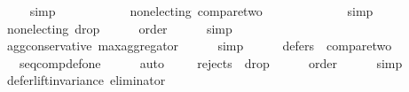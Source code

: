 \begin{isabellebody}
\ \ \ \ \isamarkupfalse%
\ simp\isanewline
\ \ \ \ \ \ \isanewline
\ \ \isamarkupfalse%
\ {}{}{}{\isacharcolon}{\kern0pt}\ {\isachardoublequoteopen}non{\isacharunderscore}{\kern0pt}electing\ {\isacharquery}{\kern0pt}compare{\isacharunderscore}{\kern0pt}two{\isachardoublequoteclose}\isanewline
\ \ \ \ \isamarkupfalse%
\ {}{}{}{}\ {}{}{}{}\isanewline
\ \ \ \ \isamarkupfalse%
\ simp\ \isanewline
\ \ \isamarkupfalse%
\ {}{}{}{\isacharcolon}{\kern0pt}\ {\isachardoublequoteopen}non{\isacharunderscore}{\kern0pt}electing\ {\isacharquery}{\kern0pt}drop{}{\isachardoublequoteclose}\isanewline
\ \ \ \ \isamarkupfalse%
\ order\isanewline
\ \ \ \ \isamarkupfalse%
\ simp\ \isanewline
\ \ \isamarkupfalse%
\ {}{}{}{\isacharcolon}{\kern0pt}\ {\isachardoublequoteopen}agg{\isacharunderscore}{\kern0pt}conservative\ max{\isacharunderscore}{\kern0pt}aggregator{\isachardoublequoteclose}\isanewline
\ \ \ \ \isamarkupfalse%
\ simp\ \isanewline
\ \ \isamarkupfalse%
\ {}{}{}{\isacharcolon}{\kern0pt}\ {\isachardoublequoteopen}defers\ {}\ {\isacharquery}{\kern0pt}compare{\isacharunderscore}{\kern0pt}two{\isachardoublequoteclose}\isanewline
\ \ \ \ \isamarkupfalse%
\ {}{}{}{}\ {}{}{}{}\ {}{}{}{}\ seq{\isacharunderscore}{\kern0pt}comp{\isacharunderscore}{\kern0pt}def{\isacharunderscore}{\kern0pt}one\isanewline
\ \ \ \ \isamarkupfalse%
\ auto\isanewline
\ \ \isamarkupfalse%
\ {}{}{}{\isacharcolon}{\kern0pt}\ {\isachardoublequoteopen}rejects\ {}\ {\isacharquery}{\kern0pt}drop{}{\isachardoublequoteclose}\isanewline
\ \ \ \ \isamarkupfalse%
\ order\isanewline
\ \ \ \ \isamarkupfalse%
\ simp\ \isanewline
\isanewline
\ \ \isamarkupfalse%
\ {}{}{\isacharcolon}{\kern0pt}\ {\isachardoublequoteopen}defer{\isacharunderscore}{\kern0pt}lift{\isacharunderscore}{\kern0pt}invariance\ {\isacharquery}{\kern0pt}eliminator{\isachardoublequoteclose}\isanewline
\ \ \ \ \isamarkupfalse%

\end{isabellebody}
